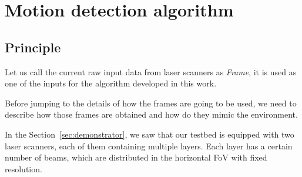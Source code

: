 %
%
%
%
%
%
\section{Motion detection algorithm}

\subsection{Principle} 

Let us call the current raw input data from laser scanners as \textit{Frame}, it is used as one of the inputs for the algorithm developed in this work.

Before jumping to the  details of how the frames are going to be used, we need to describe how those frames are obtained and how do they mimic the environment.

In the Section~\ref{sec:demonstrator}, we saw that our testbed is equipped with two laser scanners, each of them containing multiple layers. Each layer has a certain number of beams, which are distributed in the horizontal FoV with fixed resolution. 

